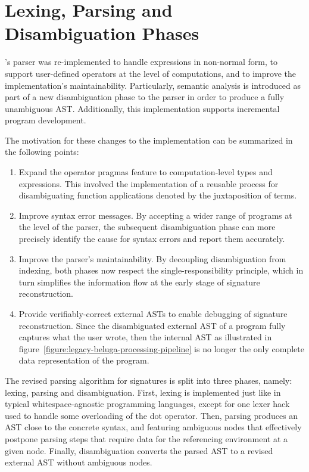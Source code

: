 


\section{\Beluga Lexing, Parsing and Disambiguation Phases}

\Beluga's parser was re-implemented to handle expressions in non-normal form, to support user-defined operators at the level of computations, and to improve the implementation's maintainability.
Particularly, semantic analysis is introduced as part of a new disambiguation phase to the parser in order to produce a fully unambiguous \ac{AST}.
Additionally, this implementation supports incremental program development.

The motivation for these changes to the implementation can be summarized in the following points:
\begin{enumerate}
\item
Expand the operator pragmas feature to computation-level types and expressions.
This involved the implementation of a reusable process for disambiguating function applications denoted by the juxtaposition of terms.
\item
Improve syntax error messages.
By accepting a wider range of programs at the level of the parser, the subsequent disambiguation phase can more precisely identify the cause for syntax errors and report them accurately.
\item
Improve the parser's maintainability.
By decoupling disambiguation from indexing, both phases now respect the single-responsibility principle, which in turn simplifies the information flow at the early stage of signature reconstruction.
\item
Provide verifiably-correct external \acp{AST} to enable debugging of signature reconstruction.
Since the disambiguated external \ac{AST} of a program fully captures what the user wrote, then the internal \ac{AST} as illustrated in figure~\ref{figure:legacy-beluga-processing-pipeline} is no longer the only complete data representation of the program.
\end{enumerate}

The revised parsing algorithm for \Beluga signatures is split into three phases, namely: lexing, parsing and disambiguation.
First, lexing is implemented just like in typical whitespace-agnostic programming languages, except for one lexer hack used to handle some overloading of the dot operator.
Then, parsing produces an \ac{AST} close to the concrete syntax, and featuring ambiguous nodes that effectively postpone parsing steps that require data for the referencing environment at a given node.
Finally, disambiguation converts the parsed \ac{AST} to a revised external \ac{AST} without ambiguous nodes.

